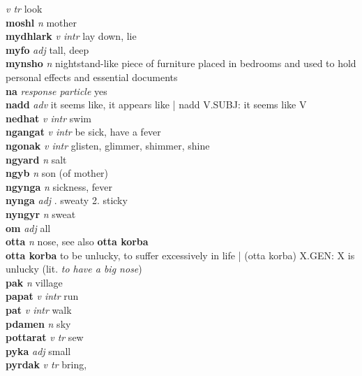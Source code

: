 \emph{v tr} \textperiodcentered look\\\textbf{moshl}   \emph{n} \textperiodcentered mother\\\textbf{mydhlark}   \emph{v intr} \textperiodcentered lay down, lie\\\textbf{myfo}   \emph{adj} \textperiodcentered tall, deep\\\textbf{mynsho}   \emph{n} \textperiodcentered nightstand-like piece of furniture placed in bedrooms and used to hold personal effects and essential documents\\\textbf{na}   \emph{response particle} \textperiodcentered yes\\\textbf{nadd}   \emph{adv} \textperiodcentered it seems like, it appears like | nadd V.SUBJ: it seems like V\\\textbf{nedhat}   \emph{v intr} \textperiodcentered swim\\\textbf{ngangat}   \emph{v intr} \textperiodcentered be sick, have a fever\\\textbf{ngonak}   \emph{v intr} \textperiodcentered glisten, glimmer, shimmer, shine\\\textbf{ngyard}   \emph{n} \textperiodcentered salt\\\textbf{ngyb}   \emph{n} \textperiodcentered son (of mother)\\\textbf{ngynga}   \emph{n} \textperiodcentered sickness, fever\\\textbf{nynga}   \emph{adj} . sweaty 2. sticky \\\textbf{nyngyr}   \emph{n} \textperiodcentered sweat\\\textbf{om}   \emph{adj} \textperiodcentered all\\\textbf{otta}   \emph{n} \textperiodcentered nose, see also \textbf{otta korba}\\\textbf{otta korba}    \textperiodcentered to be unlucky, to suffer excessively in life | (otta korba) X.GEN: X is unlucky (lit. \emph{to have a big nose})\\\textbf{pak}   \emph{n} \textperiodcentered village\\\textbf{papat}   \emph{v intr} \textperiodcentered run\\\textbf{pat}   \emph{v intr} \textperiodcentered walk\\\textbf{pdamen}   \emph{n} \textperiodcentered sky\\\textbf{pottarat}   \emph{v tr} \textperiodcentered sew\\\textbf{pyka}   \emph{adj} \textperiodcentered small\\\textbf{pyrdak}   \emph{v tr} \textperiodcentered bring, 